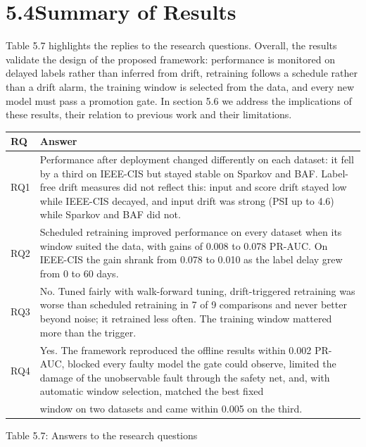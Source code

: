 \documentclass[11pt,letterpaper]{report}
\begin{document}
\section*{5.4\quad Summary of Results}

Table 5.7 highlights the replies to the research questions. Overall, the results validate the design of the proposed framework: performance is monitored on delayed labels rather than inferred from drift, retraining follows a schedule rather than a drift alarm, the training window is selected from the data, and every new model must pass a promotion gate. In section 5.6 we address the implications of these results, their relation to previous work and their limitations.

{\small
\begin{longtable}{|>{\raggedright\arraybackslash}p{}|>{\raggedright\arraybackslash}p{}|}
\hline
RQ & Answer \\ \hline
RQ1 & Performance after deployment changed differently on each dataset: it fell by a third on IEEE-CIS but stayed stable on Sparkov and BAF. Label-free drift measures did not reflect this: input and score drift stayed low while IEEE-CIS decayed, and input drift was strong (PSI up to 4.6) while Sparkov and BAF did not. \\ \hline
RQ2 & Scheduled retraining improved performance on every dataset when its window suited the data, with gains of 0.008 to 0.078 PR-AUC. On IEEE-CIS the gain shrank from 0.078 to 0.010 as the label delay grew from 0 to 60 days. \\ \hline
RQ3 & No. Tuned fairly with walk-forward tuning, drift-triggered retraining was worse than scheduled retraining in 7 of 9 comparisons and never better beyond noise; it retrained less often. The training window mattered more than the trigger. \\ \hline
RQ4 & Yes. The framework reproduced the offline results within 0.002 PR-AUC, blocked every faulty model the gate could observe, limited the damage of the unobservable fault through the safety net, and, with automatic window selection, matched the best fixed \\ \hline
 & window on two datasets and came within 0.005 on the third. \\ \hline
\end{longtable}
}

\begin{center}\small Table 5.7: Answers to the research questions\end{center}
\vspace{-1.2em}
\end{document}
